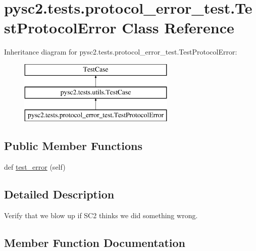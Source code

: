 \hypertarget{classpysc2_1_1tests_1_1protocol__error__test_1_1_test_protocol_error}{}\section{pysc2.\+tests.\+protocol\+\_\+error\+\_\+test.\+Test\+Protocol\+Error Class Reference}
\label{classpysc2_1_1tests_1_1protocol__error__test_1_1_test_protocol_error}
Inheritance diagram for pysc2.\+tests.\+protocol\+\_\+error\+\_\+test.\+Test\+Protocol\+Error\+:\begin{figure}[H]
\begin{center}
\leavevmode
\includegraphics[height=3.000000cm]{classpysc2_1_1tests_1_1protocol__error__test_1_1_test_protocol_error}
\end{center}
\end{figure}
\subsection*{Public Member Functions}
\begin{DoxyCompactItemize}
\item 
def \mbox{\hyperlink{classpysc2_1_1tests_1_1protocol__error__test_1_1_test_protocol_error_ac8b66360b42ba2224e2fc6c8945d8ba5}{test\+\_\+error}} (self)
\end{DoxyCompactItemize}


\subsection{Detailed Description}
\begin{DoxyVerb}Verify that we blow up if SC2 thinks we did something wrong.\end{DoxyVerb}
 

\subsection{Member Function Documentation}
\mbox{\label{classpysc2_1_1tests_1_1protocol__error__test_1_1_test_protocol_error_ac8b66360b42ba2224e2fc6c8945d8ba5}} 
